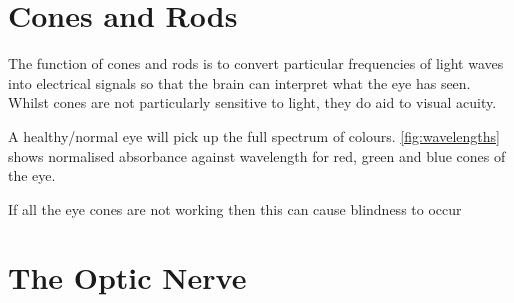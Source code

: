 \section{Cones and Rods}

The function of cones and rods is to convert particular frequencies of light
waves
into electrical signals so that the brain can interpret what the eye has seen.
Whilst cones are not particularly sensitive to light, they do aid to visual
acuity.
\cite{}

A healthy/normal eye will pick up the full spectrum of colours.
\ref{fig:wavelengths} shows normalised absorbance against wavelength for red,
green and blue cones of the eye.

If all the eye cones are not working then this can cause
blindness to occur\cite{}

\section{The Optic Nerve}
